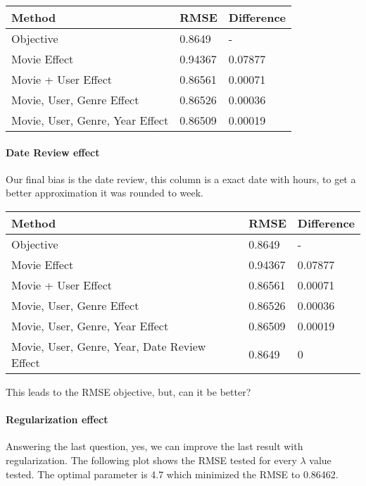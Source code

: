 \documentclass[
]{article}
\begin{document}
\begin{longtable}[]{@{}lll@{}}
\toprule\noalign{}
Method & RMSE & Difference \\
\midrule\noalign{}
\endhead
\bottomrule\noalign{}
\endlastfoot
Objective & 0.8649 & - \\
Movie Effect & 0.94367 & 0.07877 \\
Movie + User Effect & 0.86561 & 0.00071 \\
Movie, User, Genre Effect & 0.86526 & 0.00036 \\
Movie, User, Genre, Year Effect & 0.86509 & 0.00019 \\
\end{longtable}

\hypertarget{date-review-effect}{%
\paragraph{Date Review effect}\label{date-review-effect}}

Our final bias is the date review, this column is a exact date with
hours, to get a better approximation it was rounded to week.

\begin{longtable}[]{@{}lll@{}}
\toprule\noalign{}
Method & RMSE & Difference \\
\midrule\noalign{}
\endhead
\bottomrule\noalign{}
\endlastfoot
Objective & 0.8649 & - \\
Movie Effect & 0.94367 & 0.07877 \\
Movie + User Effect & 0.86561 & 0.00071 \\
Movie, User, Genre Effect & 0.86526 & 0.00036 \\
Movie, User, Genre, Year Effect & 0.86509 & 0.00019 \\
Movie, User, Genre, Year, Date Review Effect & 0.8649 & 0 \\
\end{longtable}

This leads to the RMSE objective, but, can it be better?

\hypertarget{regularization-effect}{%
\paragraph{Regularization effect}\label{regularization-effect}}

Answering the last question, yes, we can improve the last result with
regularization. The following plot shows the RMSE tested for every
\(\lambda\) value tested. The optimal parameter is 4.7 which minimized
the RMSE to 0.86462.
\end{document}
